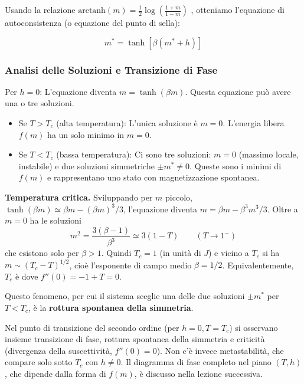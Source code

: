 \noindent Usando la relazione $\text{arctanh}(m) = \frac{1}{2} \log\left(\frac{1+m}{1-m}\right)$ , otteniamo l'equazione di autoconsistenza (o equazione del punto di sella):


\begin{tcolorbox}[colback=yellow!25, colframe=yellow!75!orange, coltitle=black, title=\textbf{Equazione di Autoconsistenza}]
\begin{equation}
m^* = \tanh\left[\beta(m^* + h)\right]
\end{equation}
\end{tcolorbox}


\subsubsection*{Analisi delle Soluzioni e Transizione di Fase}

Per $h=0$: L'equazione diventa $m = \tanh(\beta m)$. Questa equazione può avere una o tre soluzioni.

\begin{itemize}
    \item Se $T > T_c$ (alta temperatura): L'unica soluzione è $m=0$. L'energia libera $f(m)$ ha un solo minimo in $m=0$.
    \item Se $T < T_c$ (bassa temperatura):  Ci sono tre soluzioni: $m=0$ (massimo locale, instabile) e due soluzioni simmetriche $\pm m^* \neq 0$. Queste sono i minimi di $f(m)$ e rappresentano uno stato con magnetizzazione spontanea.
\end{itemize}

\noindent \textbf{Temperatura critica.} Sviluppando per $m$ piccolo, $\tanh(\beta m) \simeq \beta m - (\beta m)^3/3$, l'equazione diventa $m = \beta m - \beta^3 m^3/3$. Oltre a $m=0$ ha le soluzioni
\begin{equation}
    m^2 = \frac{3(\beta - 1)}{\beta^3} \simeq 3(1-T) \qquad (T \to 1^-)
\end{equation}
che esistono solo per $\beta > 1$. Quindi $T_c = 1$ (in unità di $J$) e vicino a $T_c$ si ha $m \sim (T_c - T)^{1/2}$, cioè l'esponente di campo medio $\beta = 1/2$. Equivalentemente, $T_c$ è dove $f''(0) = -1 + T = 0$.

\noindent Questo fenomeno, per cui il sistema sceglie una delle due soluzioni $\pm m^*$ per $T < T_c$, è la \textbf{rottura spontanea della simmetria}.

\noindent Nel punto di transizione del secondo ordine (per $h=0, T=T_c$) si osservano insieme transizione di fase, rottura spontanea della simmetria e criticità (divergenza della suscettività, $f''(0) = 0$). Non c'è invece metastabilità, che compare solo sotto $T_c$ con $h \neq 0$. Il diagramma di fase completo nel piano $(T,h)$, che dipende dalla forma di $f(m)$, è discusso nella lezione successiva.



